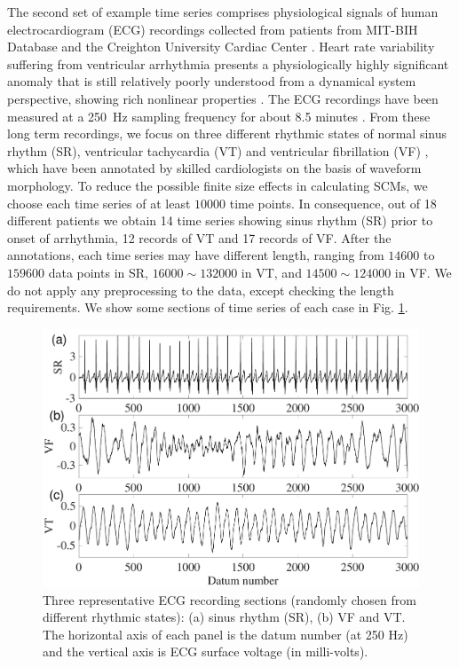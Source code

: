 \documentclass[aip,cha,reprint,nofootinbib]{revtex4-1}
\begin{document}
The second set of example time series comprises physiological signals of human electrocardiogram (ECG) recordings collected from patients from MIT-BIH Database and the Creighton University Cardiac Center \cite{GoldbergerMITBIH2000}. Heart rate variability suffering from ventricular arrhythmia presents a physiologically highly significant anomaly that is still relatively poorly understood from a dynamical system perspective, showing rich nonlinear properties \cite{smallCSF2002}. {\color{red}The ECG recordings have been measured at a 250~Hz sampling frequency for about 8.5 minutes \cite{GoldbergerMITBIH2000}. From these long term recordings, we focus on three different rhythmic states of normal sinus rhythm (SR), ventricular tachycardia (VT) and ventricular fibrillation (VF) \cite{smallCSF2002}, which have been annotated by skilled cardiologists on the basis of waveform morphology. To reduce the possible finite size effects in calculating SCMs, we choose each time series of at least $10000$ time points. In consequence, out of 18 different patients we obtain 14 time series showing sinus rhythm (SR) prior to onset of arrhythmia, 12 records of VT and 17 records of VF. After the annotations, each time series may have different length, ranging from $14600$ to $159600$ data points in SR, $16000\sim 132000$ in VT, and $14500 \sim 124000$ in VF. We do not apply any preprocessing to the data, except checking the length requirements. We show some sections of time series of each case in Fig. \ref{tseriesECG}. } 
\begin{figure}
	\centering 
	\includegraphics[width=\columnwidth]{TS_ECG.pdf}
\caption{\small{Three representative ECG recording sections (randomly chosen from different rhythmic states): (a) sinus rhythm (SR), (b) VF and VT. The horizontal axis of each panel is the datum number (at 250 Hz) and the vertical axis is ECG surface voltage (in milli-volts). } \label{tseriesECG}}
\end{figure}
\end{document}
